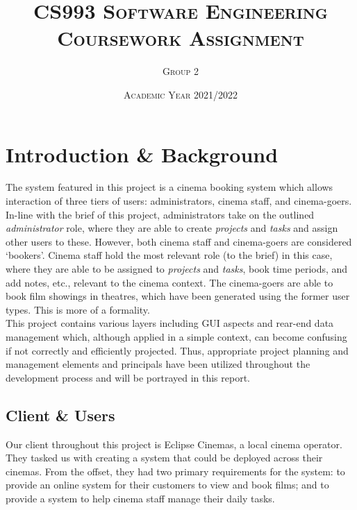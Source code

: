 \documentclass[11pt, english]{article}
\begin{document}

	\title{\textsc{CS993 Software Engineering\\ Coursework Assignment}}
	\author{\textsc{Group 2}}
	\date{\textsc{Academic Year 2021/2022}}
        \maketitle

\newpage


	\renewcommand{\contentsname}{Table of Contents}

	\tableofcontents

\newpage


\section{Introduction \& Background}

	The system featured in this project is a cinema booking system which allows interaction of three tiers of users: administrators, cinema staff, and cinema-goers. In-line with the brief of this project, administrators take on the outlined \textit{administrator} role, where they are able to create \textit{projects} and \textit{tasks} and assign other users to these. However, both cinema staff and cinema-goers are considered `bookers'. Cinema staff hold the most relevant role (to the brief) in this case, where they are able to be assigned to \textit{projects} and \textit{tasks}, book time periods, and add notes, etc., relevant to the cinema context. The cinema-goers are able to book film showings in theatres, which have been generated using the former user types. This is more of a formality.\\

	This project contains various layers including GUI aspects and rear-end data management which, although applied in a simple context, can become confusing if not correctly and efficiently projected. Thus, appropriate project planning and management elements and principals have been utilized throughout the development process and will be portrayed in this report.

	\subsection{Client \& Users}

	Our client throughout this project is Eclipse Cinemas, a local cinema operator. They tasked us with creating a system that could be deployed across their cinemas. From the offset, they had two primary requirements for the system: to provide an online system for their customers to view and book films; and to provide a system to help cinema staff manage their daily tasks.
\end{document}

